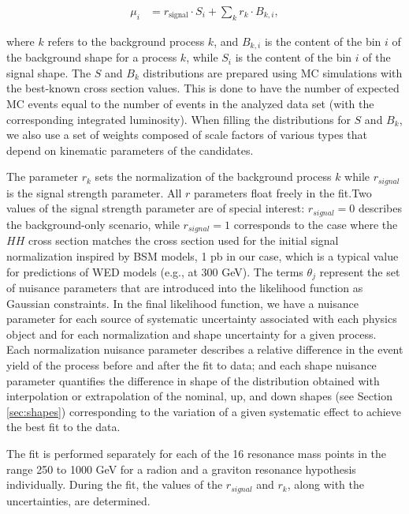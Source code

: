 \begin{align*}
\mu_{i} &= r_{\text{signal}} \cdot S_{i} + \sum_{k}r_{k}\cdot B_{k,i},
\end{align*}

\noindent where $k$ refers to the background process $k$, and $B_{k,i}$ is the content of the bin $i$ of the background
shape for a process $k$, while $S_i$ is the content of the bin $i$ of the signal shape. The $S$ and $B_k$ distributions are prepared using MC simulations with the best-known cross section values. This is done to have the number of expected MC events equal to the number of events in the analyzed data set (with the corresponding integrated luminosity). When filling the distributions for $S$ and $B_k$, we also use a set of weights composed of scale factors of various types that depend on kinematic parameters of the candidates.

The parameter $r_k$ sets the normalization of the background process $k$ while $r_{signal}$ is the signal strength parameter. All $r$ parameters float freely in the fit.Two values of the signal strength parameter are of special interest: $r_{signal} = 0$ describes the background-only scenario, while $r_{signal} = 1$ corresponds to the case where the $HH$ cross section matches the cross section used for the initial signal normalization inspired by BSM models, 1 pb in our case, which is a typical value for predictions of WED models (e.g., at 300 GeV). The terms $\theta_j$ represent the set of nuisance parameters that are introduced into the likelihood function as Gaussian constraints. In the final likelihood function, we have a nuisance parameter for each source of systematic uncertainty associated with each physics object and for each normalization and shape uncertainty for a given process. Each normalization nuisance parameter describes a relative difference in the event yield of the process before and after the fit to data; and each shape nuisance parameter quantifies the difference in shape of the \mTHH distribution obtained with interpolation or extrapolation of the nominal, up, and down shapes (see Section \ref{sec:shapes}) corresponding to the variation of a given systematic effect to achieve the best fit to the data.

The fit is performed separately for each of the 16 resonance mass points in the range 250 to 1000 GeV for a radion and a graviton resonance hypothesis individually. During the fit, the values of the $r_{signal}$ and $r_k$, along with the uncertainties, are determined. 

